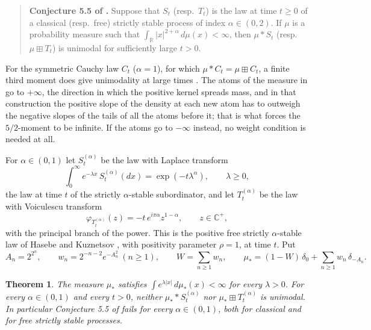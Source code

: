\documentclass[11pt]{amsart}
\newtheorem{theorem}{Theorem}[section]
\theoremstyle{definition}
\theoremstyle{remark}
\numberwithin{equation}{section}
\newcommand{\R}{\mathbb R}
\newcommand{\C}{\mathbb C}
\newcommand{\bp}{\boxplus}
\begin{document}
\begin{quote}
\textbf{Conjecture 5.5 of \cite{HU}.} Suppose that $S_t$ (resp.\ $T_t$) is the law at time $t\ge0$ of a classical (resp.\ free) strictly stable process of index $\alpha\in(0,2)$. If $\mu$ is a probability measure such that $\int_\R|x|^{2+\alpha}\,d\mu(x)<\infty$, then $\mu*S_t$ (resp.\ $\mu\bp T_t$) is unimodal for sufficiently large $t>0$.
\end{quote}

For the symmetric Cauchy law $C_t$ ($\alpha=1$), for which $\mu*C_t=\mu\bp C_t$, a finite third moment does give unimodality at large times \cite[Theorem 5.2]{HU}. The atoms of the measure in \cite[Proposition 5.4]{HU} go to $+\infty$, the direction in which the positive kernel spreads mass, and in that construction the positive slope of the density at each new atom has to outweigh the negative slopes of the tails of all the atoms before it; that is what forces the $5/2$-moment to be infinite. If the atoms go to $-\infty$ instead, no weight condition is needed at all.

For $\alpha\in(0,1)$ let $S^{(\alpha)}_t$ be the law with Laplace transform
\begin{equation}\label{eq:classical}
\int_0^\infty e^{-\lambda x}\,S^{(\alpha)}_t(dx)=\exp(-t\lambda^\alpha),\qquad \lambda\ge0,
\end{equation}
the law at time $t$ of the strictly $\alpha$-stable subordinator, and let $T^{(\alpha)}_t$ be the law with Voiculescu transform
\begin{equation}\label{eq:free}
\varphi_{T^{(\alpha)}_t}(z)=-t\,e^{i\pi\alpha}z^{1-\alpha},\qquad z\in\C^+,
\end{equation}
with the principal branch of the power. This is the positive free strictly $\alpha$-stable law of Hasebe and Kuznetsov \cite{HK}, with positivity parameter $\rho=1$, at time $t$. Put
\begin{equation}\label{eq:mustar}
A_n=2^{2^n},\qquad w_n=2^{-n-2}e^{-A_n^2}\ (n\ge1),\qquad W=\sum_{n\ge1}w_n,\qquad
\mu_\ast=(1-W)\,\delta_0+\sum_{n\ge1}w_n\,\delta_{-A_n}.
\end{equation}

\begin{theorem}\label{thm:main}
The measure $\mu_\ast$ satisfies $\int e^{\lambda|x|}\,d\mu_\ast(x)<\infty$ for every $\lambda>0$. For every $\alpha\in(0,1)$ and every $t>0$, neither $\mu_\ast*S^{(\alpha)}_t$ nor $\mu_\ast\bp T^{(\alpha)}_t$ is unimodal. In particular Conjecture 5.5 of \cite{HU} fails for every $\alpha\in(0,1)$, both for classical and for free strictly stable processes.
\end{theorem}
\end{document}
